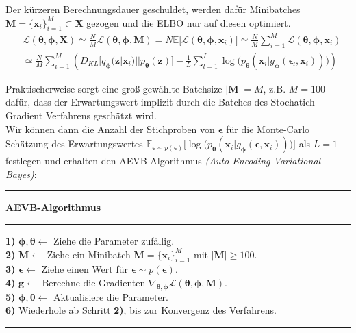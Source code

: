 \documentclass[12pt]{article}
\newcommand{\qenc}{q_{\boldsymbol\phi}(\mathbf{z}|\mathbf{x}_i)}
\newcommand{\z}{\mathbf{z}}
\begin{document}
	Der kürzeren Berechnungsdauer geschuldet, werden dafür Minibatches $\textbf{M} = \{\textbf{x}_{i}\}_{i=1}^{M} \subset \textbf{X}$ gezogen und die ELBO nur auf diesen optimiert.
	\begin{align*}
	&\mathcal{L}(\boldsymbol\theta,\boldsymbol\phi,\textbf{X}) \simeq  \frac{N}{M}\mathcal{L}(\boldsymbol\theta,\boldsymbol\phi,\textbf{M}) = N\mathbb{E}\lbrack\mathcal{L}(\boldsymbol\theta,\boldsymbol\phi,\textbf{x}_{i})\rbrack \simeq \frac{N}{M}\sum_{i=1}^{M}\mathcal{L}(\boldsymbol\theta,\boldsymbol\phi,\textbf{x}_{i})\\
	&\simeq \frac{N}{M}\sum_{i=1}^{M}  \left(D_{KL}\big[\qenc||p_{\boldsymbol\theta}(\z)\big] - \frac{1}{L}\sum_{l=1}^{L}\log\big(p_{\boldsymbol\theta}(\textbf{x}_{i}|g_{\boldsymbol\phi}(\boldsymbol\epsilon_{l},\textbf{x}_{i}))\big)\right)
	\end{align*}

	Praktischerweise sorgt eine groß gewählte Batchsize $|\textbf{M}| = M$, z.B. $M=100$ dafür, dass der Erwartungswert implizit durch die Batches des Stochatich Gradient Verfahrens geschätzt wird.\\
	Wir können dann die Anzahl der Stichproben von $\boldsymbol\epsilon$ für die Monte-Carlo Schätzung des Erwartungswertes $\mathbb{E}_{\boldsymbol\epsilon\sim p(\boldsymbol\epsilon)}\big[\log\big(p_{\boldsymbol\theta}(\textbf{x}_{i}|g_{\boldsymbol\phi}(\boldsymbol\epsilon,\textbf{x}_{i}))\big)\big]$ als $L=1$ festlegen und
	erhalten den AEVB-Algorithmus \emph{(Auto Encoding Variational Bayes)}: \\

	\hrule
	\vspace{0,15cm}
	\textbf{AEVB-Algorithmus}
	\vspace{0,05cm}
	\hrule
	\vspace{0,20cm}
	\textbf{1)}  $\boldsymbol\phi,\boldsymbol\theta \leftarrow$ Ziehe die Parameter zufällig.\\
	\textbf{2)} $\mathbf{M} \leftarrow$ Ziehe ein Minibatch $\textbf{M} = \{\textbf{x}_{i}\}_{i=1}^{M}$ mit $|\textbf{M}| \ge 100$. \\
	\textbf{3)} $\boldsymbol\epsilon \leftarrow$ Ziehe einen Wert für $\boldsymbol\epsilon \sim p(\boldsymbol\epsilon)$.\\
	\textbf{4)} $\mathbf{g} \leftarrow$ Berechne die Gradienten $\nabla_{\boldsymbol\theta,\boldsymbol\phi} \mathcal{L}(\boldsymbol\theta,\boldsymbol\phi,\textbf{M})$. \\
	\textbf{5)} $\boldsymbol\phi,\boldsymbol\theta \leftarrow$ Aktualisiere die Parameter.\\
	\textbf{6)} Wiederhole ab Schritt \textbf{2)}, bis zur Konvergenz des Verfahrens.
	\vspace{0,05cm}
	\hrule
	\vspace{0,3cm}
\end{document}
